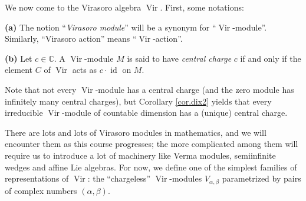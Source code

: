 \documentclass[etingof-lie.tex]{subfiles}
\begin{document}
We now come to the Virasoro algebra $\operatorname*{Vir}$. First, some notations:

\begin{definition}
\textbf{(a)} The notion ``\textit{Virasoro module}'' will be a synonym for
``$\operatorname*{Vir}$-module''. Similarly, ``Virasoro action'' means
``$\operatorname*{Vir}$-action''.

\textbf{(b)} Let $c\in\mathbb{C}$. A $\operatorname*{Vir}$-module $M$ is said
to have \textit{central charge }$c$ if and only if the element $C$ of
$\operatorname*{Vir}$ acts as $c\cdot\operatorname*{id}$ on $M$.
\end{definition}

Note that not every $\operatorname*{Vir}$-module has a central charge (and the
zero module has infinitely many central charges), but Corollary \ref{cor.dix2}
yields that every irreducible $\operatorname*{Vir}$-module of countable
dimension has a (unique) central charge.

There are lots and lots of Virasoro modules in mathematics, and we will
encounter them as this course progresses; the more complicated among them will
require us to introduce a lot of machinery like Verma modules, semiinfinite
wedges and affine Lie algebras. For now, we define one of the simplest
families of representations of $\operatorname*{Vir}$: the ``chargeless''
$\operatorname*{Vir}$-modules $V_{\alpha,\beta}$ parametrized by pairs of
complex numbers $\left(  \alpha,\beta\right)  $.
\end{document}
